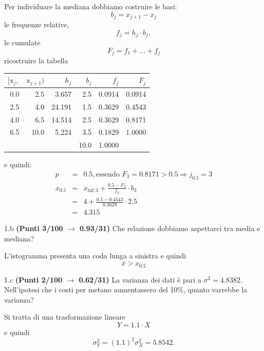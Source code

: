 \documentclass[
  11pt,
]{book}
\theoremstyle{mytheoremstyle}
\theoremstyle{mydefstyle}
\newenvironment{sol}
  {
  \begin{tcolorbox}[enhanced,breakable,arc=0.1mm,boxrule=1pt,colback=white,colframe=iblue,
  title=\bf \fontfamily{lmss}\selectfont \hspace{.5 cm} Soluzione,drop fuzzy shadow]

}{
\end{tcolorbox}
  }
\begin{document}
\begin{sol}

Per individuare la mediana dobbiamo costruire le basi:
\[
b_j=x_{j+1}-x_{j}
\]
le frequenze relative,
\[
f_j=h_j\cdot b_j,
\]
le cumulate
\[
F_j=f_1+...+f_j
\]
ricostruire la tabella

\begin{table}[H]
\centering
\begin{tabular}{rrrrrr}
\toprule
$[\text{x}_j,$ & $\text{x}_{j+1})$ & $h_j$ & $b_j$ & $f_j$ & $F_j$\\
\midrule
0.0 & 2.5 & 3.657 & 2.5 & 0.0914 & 0.0914\\
2.5 & 4.0 & 24.191 & 1.5 & 0.3629 & 0.4543\\
4.0 & 6.5 & 14.514 & 2.5 & 0.3629 & 0.8171\\
6.5 & 10.0 & 5.224 & 3.5 & 0.1829 & 1.0000\\
 &  &  & 10.0 & 1.0000 & \\
\bottomrule
\end{tabular}
\end{table}

e quindi:
\begin{eqnarray*}
  p &=&  0.5 , \text{essendo }F_{ 3 }= 0.8171  > 0.5  \Rightarrow j_{ 0.5 }= 3 \\
  x_{ 0.5 } &=& x_{\text{inf}; 3 } + \frac{ { 0.5 } - F_{ 2 }} {f_{ 3 }} \cdot b_{ 3 } \\
            &=&  4  + \frac {{ 0.5 } -  0.4543 } { 0.3629 } \cdot  2.5  \\
            &=&  4.315 
\end{eqnarray*}

\end{sol}

1.b \textbf{(Punti 3/100 \(\rightarrow\) 0.93/31)} Che relazione dobbiamo aspettarci tra media e mediana?

\begin{sol}
L'istogramma presenta una coda lunga a sinistra e quindi
\[
\bar x > x_{0.5}
\]

\end{sol}

1.c \textbf{(Punti 2/100 \(\rightarrow\) 0.62/31)} La varianza dei dati è pari a \(\sigma^2=4.8382\). Nell'ipotesi che i costi per metano aumentassero del 10\%, quanto varrebbe la varianza?

\begin{sol}
Si tratta di una trasformazione lineare
\[
Y = 1.1\cdot X
\]
e quindi
\[
\sigma_Y^2=(1.1)^2\sigma_X^2=5.8542.
\]

\end{sol}
\end{document}
